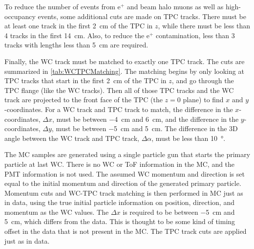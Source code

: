 \documentclass[letterpaper,12pt]{article}
\newcommand{\ep}{\ensuremath{\text{e}^{+}}}
\begin{document}
To reduce the number of events from \ep{} and beam halo muons as well as
high-occupancy events, some additional cuts are made on TPC tracks. There must
be at least one track in the first \SI{2}{\cm} of the TPC in $z$, while there
must be less than 4 tracks in the first \SI{14}{\cm}. Also, to reduce the \ep{}
contamination, less than 3 tracks with lengths less than \SI{5}{\cm} are
required.

Finally, the WC track must be matched to exactly one TPC track. The cuts are
summarized in \cref{tab:WCTPCMatching}. The matching begins by only looking at
TPC tracks that start in the first \SI{2}{\cm} of the TPC in $z$, and go
through the TPC flange (like the WC tracks). Then all of those TPC tracks and
the WC track are projected to the front face of the TPC (the $z=0$ plane) to
find $x$ and $y$-coordinates. For a WC track and TPC track to match, the
difference in the $x$-coordinates, $\Delta x$, must be between \SI{-4}{\cm} and
\SI{6}{\cm}, and the difference in the $y$-coordinates, $\Delta y$, must be
between \SI{-5}{\cm} and \SI{5}{\cm}. The difference in the 3D angle between
the WC track and TPC track, $\Delta \alpha$, must be less than
\SI{10}{\degree}.

The MC samples are generated using a single particle gun that starts the
primary particle at last WC. There is no WC or ToF information in the MC, and
the PMT information is not used. The assumed WC momentum and direction is set
equal to the initial momentum and direction of the generated primary particle.
Momentum cuts and WC-TPC track matching is then performed in MC just as in
data, using the true initial particle information on position, direction, and
momentum as the WC values. The $\Delta x$ is required to be between
\SI{-5}{\cm} and \SI{5}{\cm}, which differs from the data. This is thought to
be some kind of timing offset in the data that is not present in the MC. The
TPC track cuts are applied just as in data.
\end{document}
